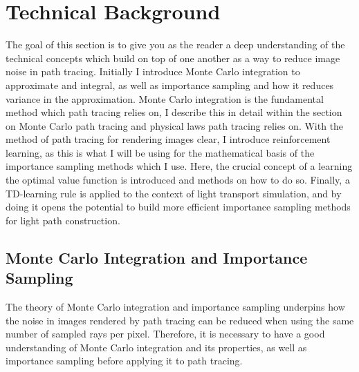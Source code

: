 \documentclass[../dissertation.tex]{subfiles}
\begin{document}
\chapter{Technical Background}
\label{chap:technical}

The goal of this section is to give you as the reader a deep understanding of the technical concepts which build on top of one another as a way to reduce image noise in path tracing. Initially I introduce Monte Carlo integration to approximate and integral, as well as importance sampling and how it reduces variance in the approximation. Monte Carlo integration is the fundamental method which path tracing relies on, I describe this in detail within the section on Monte Carlo path tracing and physical laws path tracing relies on. With the method of path tracing for rendering images clear, I introduce reinforcement learning, as this is what I will be using for the mathematical basis of the importance sampling methods which I use. Here, the crucial concept of a learning the optimal value function is introduced and methods on how to do so. Finally, a TD-learning rule is applied to the context of light transport simulation, and by doing it opens the potential to build more efficient importance sampling methods for light path construction.

\section{Monte Carlo Integration and Importance Sampling}
\label{sec:monte_carlo}
The theory of Monte Carlo integration and importance sampling underpins how the noise in images rendered by path tracing can be reduced when using the same number of sampled rays per pixel. Therefore, it is necessary to have a good understanding of Monte Carlo integration and its properties, as well as importance sampling before applying it to path tracing.
\end{document}
